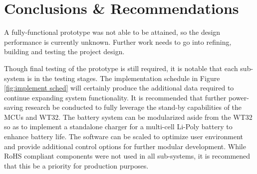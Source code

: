 \section[Conclusion]{Conclusions \& Recommendations}
A fully-functional prototype was not able to be attained, so the design
performance is currently unknown. Further work needs to go into refining,
building and testing the project design.

Though final testing of the prototype is still required, it is notable that each sub-system is
in the testing stages. The implementation schedule in Figure \ref{fig:implement sched} will
certainly produce the additional data required to continue expanding system functionality.
It is recommended that further power-saving research be conducted to fully leverage the 
stand-by capabilities of the MCUs and WT32. The battery system can be modularized aside from 
the WT32 so as to implement a standalone charger for a multi-cell Li-Poly battery to enhance
battery life. The software can be scaled to optimize user environment and provide additional control
options for further modular development. While RoHS compliant components were not used in all
sub-systems, it is recommened that this be a priority for production purposes.  

